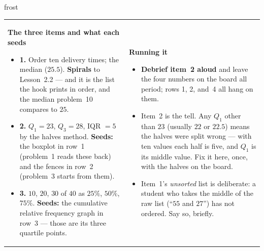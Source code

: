 \documentclass[10pt]{article}
\begin{document}
\begin{fixedskillbox}{frost}
\begin{tabularx}{\linewidth}{@{}X X@{}}
\begin{minipage}[t]{\linewidth}\vspace{0pt}
    \textbf{The three items and what each seeds}
    \begin{itemize}[leftmargin=1.1em, itemsep=1pt, topsep=2pt]
      \item \textbf{1.} Order ten delivery times; the median ($25.5$). \textbf{Spirals} to
            Lesson~2.2 --- and it is the list the hook prints in order, and the median problem~10
            compares to $25$.
      \item \textbf{2.} $Q_1 = 23$, $Q_3 = 28$, IQR $= 5$ by the halves method. \textbf{Seeds:}
            the boxplot in row~1 (problem~1 reads these back) and the fences in row~2
            (problem~3 starts from them).
      \item \textbf{3.} $10$, $20$, $30$ of $40$ as $25\%$, $50\%$, $75\%$. \textbf{Seeds:} the
            cumulative relative frequency graph in row~3 --- those are its three quartile
            points.
    \end{itemize}
\end{minipage}
&
\begin{minipage}[t]{\linewidth}\vspace{0pt}
    \textbf{Running it}
    \begin{itemize}[leftmargin=1.1em, itemsep=1pt, topsep=2pt]
      \item \textbf{Debrief item~2 aloud} and leave the four numbers on the board all period;
            rows 1, 2, and~4 all hang on them.
      \item Item~2 is the tell. Any $Q_1$ other than $23$ (usually $22$ or $22.5$) means the
            halves were split wrong --- with ten values each half is five, and $Q_1$ is its
            middle value. Fix it here, once, with the halves on the board.
      \item Item~1's \emph{unsorted} list is deliberate: a student who takes the middle of the
            raw list (``$55$ and $27$'') has not ordered. Say so, briefly.
    \end{itemize}
\end{minipage}
\end{tabularx}
\end{fixedskillbox}
\end{document}
